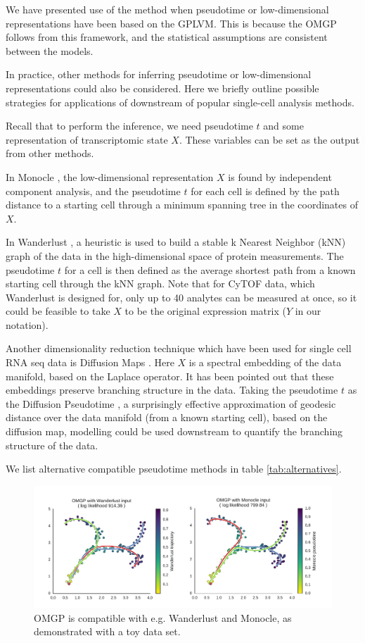 We have presented use of the  method when pseudotime or low-dimensional representations have been based on the GPLVM. This is because the OMGP follows from this framework, and the statistical assumptions are consistent between the models.

In practice, other methods for inferring pseudotime or low-dimensional representations could also be considered. Here we briefly outline possible strategies for applications of  downstream of popular single-cell analysis methods.

Recall that to perform the  inference, we need pseudotime $ t $ and some representation of transcriptomic state $ X $. These variables can be set as the output from other methods.

In Monocle \cite{Trapnell2014-cn}, the low-dimensional representation $ X $ is found by independent component analysis, and the pseudotime $ t $ for each cell is defined by the path distance to a starting cell through a minimum spanning tree in the coordinates of $ X $.

In Wanderlust \cite{Bendall2014-kg}, a heuristic is used to build a stable k Nearest Neighbor (kNN) graph of the data in the high-dimensional space of protein measurements. The pseudotime $ t $ for a cell is then defined as the average shortest path from a known starting cell through the kNN graph. Note that for CyTOF data, which Wanderlust is designed for, only up to 40 analytes can be measured at once, so it could be feasible to take $ X $ to be the original expression matrix ($ Y $ in our notation).

Another dimensionality reduction technique which have been used for single cell RNA seq data is Diffusion Maps \cite{Haghverdi2015-ig}. Here $ X $ is a spectral embedding of the  data manifold, based on the Laplace operator. It has been pointed out that these embeddings preserve branching structure in the data. Taking the pseudotime $ t $ as the Diffusion Pseudotime \cite{Haghverdi2016-tm}, a surprisingly effective approximation of geodesic distance over the data manifold (from a known starting cell), based on the diffusion map,  modelling could be used downstream to quantify the branching structure of the data.

We list alternative compatible pseudotime methods in table \ref{tab:alternatives}.

\begin{figure}
    \centering
    \includegraphics[width=\textwidth]{"fig-compatibility"}
    \caption[OMGP Compatibility]{OMGP is compatible with e.g. Wanderlust and Monocle, as demonstrated with a toy data set.}
    \label{fig:compatibility}
\end{figure}

